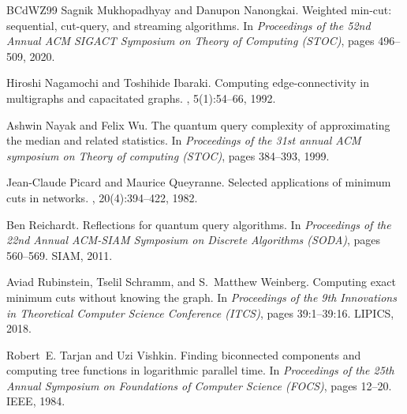 \begin{thebibliography}{BCdWZ99}
Sagnik Mukhopadhyay and Danupon Nanongkai.
\newblock Weighted min-cut: sequential, cut-query, and streaming algorithms.
\newblock In {\em Proceedings of the 52nd Annual ACM SIGACT Symposium on Theory
  of Computing (STOC)}, pages 496--509, 2020.

Hiroshi Nagamochi and Toshihide Ibaraki.
\newblock Computing edge-connectivity in multigraphs and capacitated graphs.
, 5(1):54--66, 1992.

Ashwin Nayak and Felix Wu.
\newblock The quantum query complexity of approximating the median and related
  statistics.
\newblock In {\em Proceedings of the 31st annual ACM symposium on Theory of
  computing (STOC)}, pages 384--393, 1999.

Jean-Claude Picard and Maurice Queyranne.
\newblock Selected applications of minimum cuts in networks.
,
  20(4):394--422, 1982.

Ben Reichardt.
\newblock Reflections for quantum query algorithms.
\newblock In {\em Proceedings of the 22nd Annual {ACM-SIAM} Symposium on
  Discrete Algorithms (SODA)}, pages 560--569. {SIAM}, 2011.
  
Aviad Rubinstein, Tselil Schramm, and S.~Matthew Weinberg.
\newblock Computing exact minimum cuts without knowing the graph.
\newblock In {\em Proceedings of the 9th Innovations in Theoretical Computer
  Science Conference (ITCS)}, pages 39:1--39:16. LIPICS, 2018.

Robert~E. Tarjan and Uzi Vishkin.
\newblock Finding biconnected components and computing tree functions in
  logarithmic parallel time.
\newblock In {\em Proceedings of the 25th Annual Symposium on Foundations of
  Computer Science (FOCS)}, pages 12--20. IEEE, 1984.

\end{thebibliography}
  


